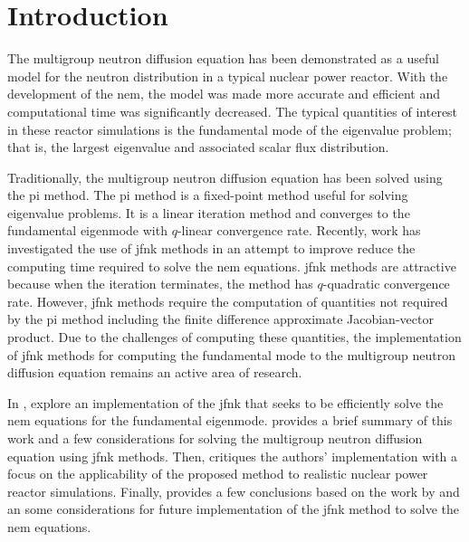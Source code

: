 \section{Introduction}
\label{sec:introduction}

  The multigroup neutron diffusion equation has been demonstrated as a useful
  model for the neutron distribution in a typical nuclear power reactor. With
  the development of the \gls{nem}, the model was made more accurate and
  efficient and computational time was significantly decreased. The typical
  quantities of interest in these reactor simulations is the fundamental mode of
  the eigenvalue problem; that is, the largest eigenvalue and associated scalar
  flux distribution.

  Traditionally, the multigroup neutron diffusion equation has been solved using
  the \gls{pi} method. The \gls{pi} method is a fixed-point method useful for
  solving eigenvalue problems. It is a linear iteration method and converges to
  the fundamental eigenmode with $q$-linear convergence rate.  Recently, work
  has investigated the use of \gls{jfnk} methods in an attempt to improve reduce
  the computing time required to solve the \gls{nem} equations.
  \gls{jfnk} methods are attractive because when the iteration
  terminates, the method has $q$-quadratic convergence rate. However, \gls{jfnk}
  methods require the computation of quantities not required by the \gls{pi}
  method including the finite difference approximate Jacobian-vector product. 
  Due to the challenges of computing these quantities, the implementation of
  \gls{jfnk} methods for computing the fundamental mode to the multigroup
  neutron diffusion equation remains an active area of research.

  In , \citeauthor{qe2paper} explore an implementation of
  the \gls{jfnk} that seeks to be efficiently solve the \gls{nem} equations for
  the fundamental eigenmode.  provides a brief summary of this
  work and a few considerations for solving the multigroup neutron diffusion
  equation using \gls{jfnk} methods. Then,  critiques the
  authors' implementation with a focus on the applicability of the proposed
  method to realistic nuclear power reactor simulations. Finally,
   provides a few conclusions based on the work by
  \citeauthor{qe2paper} and an some considerations for future implementation of 
  the \gls{jfnk} method to solve the \gls{nem} equations.
